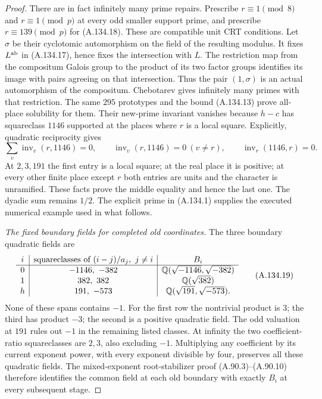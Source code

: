 \begin{proof}
There are in fact infinitely many prime repairs.
Prescribe $r\equiv1\pmod8$ and $r\equiv1\pmod p$
at every odd smaller support prime, and prescribe
$r\equiv139\pmod p$ for (A.134.18).
These are compatible unit CRT conditions.
Let $\sigma$ be their cyclotomic automorphism
on the field of the resulting modulus.
It fixes $L^{\rm ab}$ in (A.134.17), hence fixes
the intersection with $L$.
The restriction map from the compositum Galois
group to the product of its two factor groups
identifies its image with pairs agreeing on that
intersection.
Thus the pair $(1,\sigma)$ is an actual
automorphism of the compositum.
Chebotarev
\cite[Theorem 8.31]{AgentMilneANT}
gives infinitely many primes with that restriction.
The same $295$ prototypes and the bound
(A.134.13) prove all-place solubility for them.
Their new-prime invariant vanishes because
$h-c$ has squareclass $1146$ supported at the
places where $r$ is a local square.
Explicitly, quadratic reciprocity gives
\[
       \sum_v\operatorname{inv}_v(r,1146)=0,\qquad
       \operatorname{inv}_v(r,1146)=0\ (v\ne r),
             \qquad \operatorname{inv}_r(1146,r)=0.
\]
At $2,3,191$ the first entry is a local square;
at the real place it is positive; at every other
finite place except $r$ both entries are units
and the character is unramified.
These facts prove the middle equality and hence
the last one.
The dyadic sum remains $1/2$.
The explicit prime in (A.134.1) supplies the
executed numerical example used in what follows.

\emph{The fixed boundary fields for completed old coordinates.}
The three boundary quadratic fields are
\[
 \begin{array}{c|c|c}
 i&\text{squareclasses of }(i-j)/a_j,\ j\ne i&B_i\\ \hline
 0&-1146,\ -382&\mathbb Q(\sqrt{-1146},\sqrt{-382})\\
 1&382,\ 382&\mathbb Q(\sqrt{382})\\
 h&191,\ -573&\mathbb Q(\sqrt{191},\sqrt{-573}).
 \end{array}
\tag{A.134.19}
\]
None of these spans contains $-1$.
For the first row the nontrivial product is $3$;
the third has product $-3$; the second is a
positive quadratic field.
The odd valuation at $191$ rules out $-1$ in
the remaining listed classes.
At infinity the two coefficient-ratio
squareclasses are $2,3$, also excluding $-1$.
Multiplying any coefficient by its current
exponent power, with every exponent divisible
by four, preserves all these quadratic fields.
The mixed-exponent root-stabilizer proof
(A.90.3)--(A.90.10) therefore identifies the
common field at each old boundary with exactly
$B_i$ at every subsequent stage.


\end{proof}
